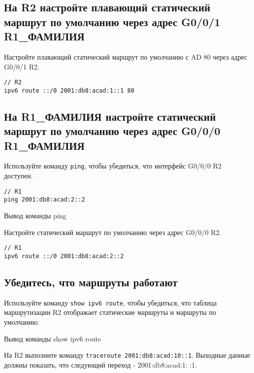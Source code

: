 \subsection{На R2 настройте плавающий статический маршрут
по умолчанию через адрес G0/0/1 R1\_ФАМИЛИЯ}

Настройте плавающий статический маршрут
по умолчанию с AD 80 через адрес G0/0/1 R2.

\begin{verbatim}
// R2
ipv6 route ::/0 2001:db8:acad:1::1 80
\end{verbatim}

\subsection{На R1\_ФАМИЛИЯ настройте статический маршрут
по умолчанию через адрес G0/0/0 R1\_ФАМИЛИЯ}

Используйте команду \texttt{ping}, чтобы убедиться,
что интерфейс G0/0/0 R2 доступен.

\begin{verbatim}
// R1
ping 2001:db8:acad:2::2
\end{verbatim}

\begin{image}
    \caption{Вывод команды ping}
\end{image}

Настройте статический маршрут по умолчанию через адрес G0/0/0 R2.

\begin{verbatim}
// R1
ipv6 route ::/0 2001:db8:acad:2::2
\end{verbatim}

\subsection{Убедитесь, что маршруты работают}

Используйте команду \texttt{show ipv6 route}, чтобы убедиться,
что таблица маршрутизации R2 отображает статические маршруты
и маршруты по умолчанию.

\begin{image}
    \caption{Вывод команды show ipv6 route}
\end{image}

На R2 выполните команду \texttt{traceroute 2001:db8:acad:10::1}.
Выходные данные должны показать, что следующий переход - 2001:db8:acad:1: :1.

